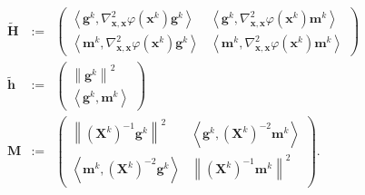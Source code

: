 \documentclass{article}
\newcommand{\assign}{:=}
\newcommand{\x}{\mathbf{x}}
\newcommand{\0}{\textbf{0}}
\newcommand{\X}{\mathbf{X}}
\newcommand{\tmH}{\mathbf{H}}
\newcommand{\h}{\mathbf{h}}
\newcommand{\m}{\mathbf{m}}
\newcommand{\g}{\mathbf{g}}
\newcommand{\M}{\mathbf{M}}
\begin{document}
\begin{eqnarray*}
  \widetilde{\tmH} & \assign & \left(\begin{array}{cc}
    \left\langle \g^k, \nabla^2_{\x, \x} \varphi \left( \x^k \right) \g^k
    \right\rangle & \left\langle \g^k, \nabla^2_{\x, \x} \varphi \left( \x^k
    \right) \m^k \right\rangle\\
    \left\langle \m^k, \nabla^2_{\x, \x} \varphi \left( \x^k \right) \g^k
    \right\rangle & \left\langle \m^k, \nabla^2_{\x, \x} \varphi \left( \x^k
    \right) \m^k \right\rangle
  \end{array}\right)\\
  \widetilde{\h} & \assign & \left(\begin{array}{c}
    \left\| \g^k \right\|^2\\
    \left\langle \g^k, \m^k \right\rangle
  \end{array}\right)\\
  \M & \assign & \left(\begin{array}{cc}
    \left\| \left( \X^k \right)^{- 1} \g^k \right\|^2 & \left\langle \g^k,
    \left( \X^k \right)^{- 2} \m^k \right\rangle\\
    \left\langle \m^k, \left( \X^k \right)^{- 2} \g^k \right\rangle & \left\|
    \left( \X^k \right)^{- 1} \m^k \right\|^2
  \end{array}\right) .
\end{eqnarray*}
\end{document}
